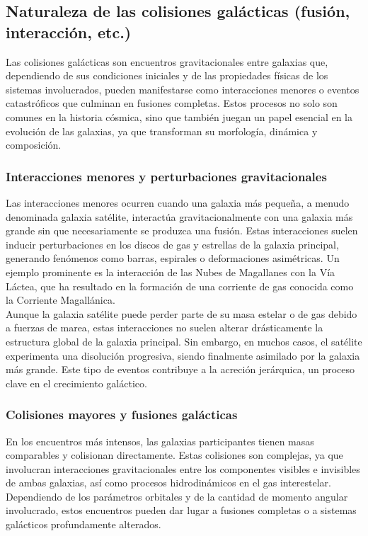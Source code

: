 \documentclass{article}
\begin{document}
\subsection{Naturaleza de las colisiones galácticas (fusión, interacción, etc.)}
Las colisiones galácticas son encuentros gravitacionales entre galaxias que, dependiendo de sus condiciones iniciales y de las propiedades físicas de los sistemas involucrados, pueden manifestarse como interacciones menores o eventos catastróficos que culminan en fusiones completas. Estos procesos no solo son comunes en la historia cósmica, sino que también juegan un papel esencial en la evolución de las galaxias, ya que transforman su morfología, dinámica y composición. \\

\subsubsection{Interacciones menores y perturbaciones gravitacionales}
Las interacciones menores ocurren cuando una galaxia más pequeña, a menudo denominada galaxia satélite, interactúa gravitacionalmente con una galaxia más grande sin que necesariamente se produzca una fusión. Estas interacciones suelen inducir perturbaciones en los discos de gas y estrellas de la galaxia principal, generando fenómenos como barras, espirales o deformaciones asimétricas. Un ejemplo prominente es la interacción de las Nubes de Magallanes con la Vía Láctea, que ha resultado en la formación de una corriente de gas conocida como la Corriente Magallánica. \\

Aunque la galaxia satélite puede perder parte de su masa estelar o de gas debido a fuerzas de marea, estas interacciones no suelen alterar drásticamente la estructura global de la galaxia principal. Sin embargo, en muchos casos, el satélite experimenta una disolución progresiva, siendo finalmente asimilado por la galaxia más grande. Este tipo de eventos contribuye a la acreción jerárquica, un proceso clave en el crecimiento galáctico. \\

\subsubsection{Colisiones mayores y fusiones galácticas}
En los encuentros más intensos, las galaxias participantes tienen masas comparables y colisionan directamente. Estas colisiones son complejas, ya que involucran interacciones gravitacionales entre los componentes visibles e invisibles de ambas galaxias, así como procesos hidrodinámicos en el gas interestelar. Dependiendo de los parámetros orbitales y de la cantidad de momento angular involucrado, estos encuentros pueden dar lugar a fusiones completas o a sistemas galácticos profundamente alterados. \\
\end{document}

